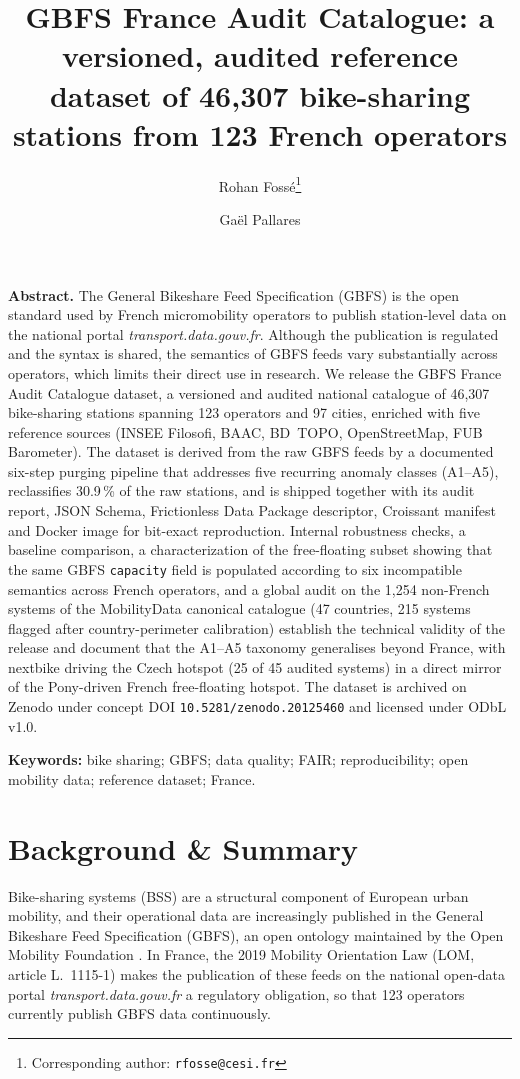 \documentclass[11pt,a4paper]{article}
\title{\bfseries\sffamily\Large GBFS France Audit Catalogue: a versioned, audited
reference dataset of 46{,}307 bike-sharing stations from 123 French operators}
\author[1]{Rohan Foss\'e\thanks{Corresponding author: \texttt{rfosse@cesi.fr}}}
\author[2]{Ga\"el Pallares}
\affil[1]{CESI Engineering School, Montpellier, France}
\affil[2]{CESI LINEACT (EA 7527), Montpellier, France}
\date{}
\begin{document}
\maketitle

\noindent\textbf{Abstract.}
The General Bikeshare Feed Specification (GBFS) is the open standard
used by French micromobility operators to publish station-level data
on the national portal \emph{transport.data.gouv.fr}. Although the
publication is regulated and the syntax is shared, the semantics of
GBFS feeds vary substantially across operators, which limits their
direct use in research. We release the GBFS France Audit Catalogue
dataset, a versioned and audited national catalogue of 46{,}307
bike-sharing stations spanning 123 operators and 97 cities, enriched
with five reference sources (INSEE Filosofi, BAAC, BD~TOPO,
OpenStreetMap, FUB Barometer). The dataset is derived from the raw
GBFS feeds by a documented six-step purging pipeline that addresses
five recurring anomaly classes (A1--A5), reclassifies 30.9\,\% of the
raw stations, and is shipped together with its audit report, JSON
Schema, Frictionless Data Package descriptor, Croissant manifest and
Docker image for bit-exact reproduction. Internal robustness checks,
a baseline comparison, a characterization of the free-floating
subset showing that the same GBFS \texttt{capacity} field is
populated according to six incompatible semantics across French
operators, and a global audit on the 1{,}254 non-French systems of
the MobilityData canonical catalogue (47 countries, 215 systems
flagged after country-perimeter calibration) establish the technical
validity of the release and document that the A1--A5 taxonomy
generalises beyond France, with nextbike driving the Czech hotspot
(25 of 45 audited systems) in a direct mirror of the Pony-driven
French free-floating hotspot. The dataset is archived on Zenodo under concept DOI
\texttt{10.5281/zenodo.20125460} and licensed under ODbL v1.0.

\vspace{0.5em}
\noindent\textbf{Keywords:} bike sharing; GBFS; data quality; FAIR;
reproducibility; open mobility data; reference dataset; France.

\section{Background \& Summary}\label{secBackground}

Bike-sharing systems (BSS) are a structural component of European
urban mobility, and their operational data are increasingly published
in the General Bikeshare Feed Specification (GBFS), an open ontology
maintained by the Open Mobility Foundation \cite{Mobi2024,OMF2023}. In
France, the 2019 Mobility Orientation Law (LOM, article L.~1115-1)
makes the publication of these feeds on the national open-data portal
\emph{transport.data.gouv.fr} a regulatory obligation, so that 123
operators currently publish GBFS data continuously.
\end{document}
